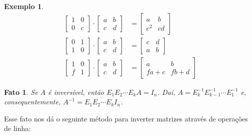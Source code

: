 \documentclass{article}
\newtheorem*{fact}{Fato}
\newtheorem*{example}{Exemplo}
\begin{document}
\begin{example}
	\begin{align*}
	\begin{bmatrix}
	1 & 0 \\
	0 & c
	\end{bmatrix}\cdot\begin{bmatrix}
	a & b \\
	c & d
	\end{bmatrix} &= \begin{bmatrix}
	a & b \\
	c^2 & cd
	\end{bmatrix} \\
	\begin{bmatrix}
	0 & 1 \\
	1 & 0
	\end{bmatrix}\cdot\begin{bmatrix}
	a & b \\
	c & d
	\end{bmatrix} &= \begin{bmatrix}
	c & d \\
	a & b
	\end{bmatrix} \\
	\begin{bmatrix}
	1 & 0 \\
	f & 1
	\end{bmatrix}\cdot\begin{bmatrix}
	a & b \\
	c & d
	\end{bmatrix} &= \begin{bmatrix}
	a & b \\
	fa + c & fb + d
	\end{bmatrix}
	\end{align*}
\end{example}

\begin{fact}
	Se $A$ é inversível, então $E_1E_2\cdots E_kA = I_n$. Daí, $A = E_k^{-1}E_{k-1}^{-1}\cdots E_1^{-1}$ e, consequentemente, $A^{-1} = E_1E_2\cdots E_kI_n$.
\end{fact}
\par\vspace{0.3cm} Esse fato nos dá o seguinte método para inverter matrizes através de operações de linha:
\end{document}
